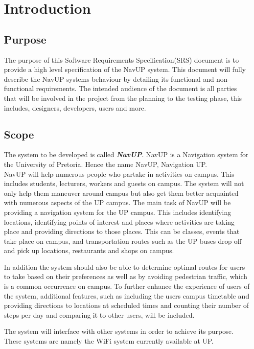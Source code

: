 \documentclass[a4paper,12pt]{article}
\begin{document}
\newpage
\tableofcontents
\newpage

\section{Introduction}
\subsection{Purpose}
The purpose of this Software Requirements Specification(SRS) document is to provide a high level specification of the NavUP system. This document will fully describe the NavUP systems behaviour by detailing its functional and non-functional requirements. The intended audience of the document is all parties that will be involved in the project from the planning to the testing phase, this includes, designers, developers, users and more.
\subsection{Scope}
The system to be developed is called \textit{\textbf{NavUP}}. NavUP is a Navigation system for the University of Pretoria. Hence the name NavUP, Navigation UP. \\

NavUP will help numerous people who partake in activities on campus. This includes students, lecturers, workers and guests on campus. The system will not only help them maneuver around campus but also get them better acquainted with numerous aspects of the UP campus. The main task of NavUP will be providing a navigation system for the UP campus. This includes identifying locations, identifying points of interest and places where activities are taking place and providing directions to those places. This can be classes, events that take place on campus, and transportation routes such as the UP buses drop off and pick up locations, restaurants and shops on campus.

In addition the system should also be able to determine optimal routes for users to take based on their preferences as well as by avoiding pedestrian traffic, which is a common occurrence on campus. To further enhance the experience of users of the system, additional features, such as including the users campus timetable and providing directions to locations at scheduled times and counting their number of steps per day and comparing it to other users, will be included. 

The system will interface with other systems in order to achieve its purpose. These systems are namely the WiFi system currently available at UP.
\end{document}
